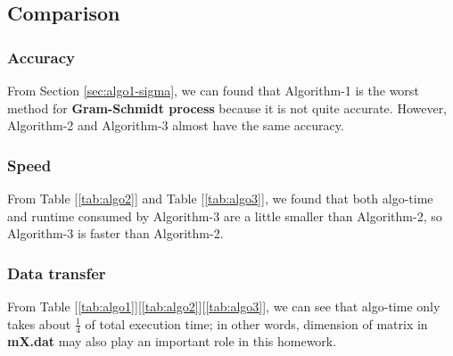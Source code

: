 \documentclass{article}
\begin{document}
\subsection{Comparison}
\subsubsection{Accuracy}
From Section \ref{sec:algo1-sigma}, we can found that Algorithm-1 is the worst method for \textbf{Gram-Schmidt process} because it is not
quite accurate. However, Algorithm-2 and Algorithm-3 almost have the same accuracy.
\subsubsection{Speed}
From Table [\ref{tab:algo2}] and Table [\ref{tab:algo3}], we found that both algo-time and runtime consumed by Algorithm-3 are a little
smaller than Algorithm-2, so Algorithm-3 is faster than Algorithm-2.
\subsubsection{Data transfer}
From Table [\ref{tab:algo1}][\ref{tab:algo2}][\ref{tab:algo3}], we can see that algo-time only takes about $\frac{1}{4}$ of total
execution time; in other words, dimension of matrix in \textbf{mX.dat} may also play an important role in this homework.

\end{document}
